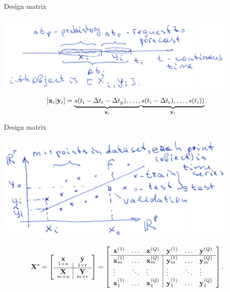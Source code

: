 \documentclass{beamer}
\begin{document}
\begin{frame}{Design matrix}

\includegraphics[width=0.9\textwidth]{draw_object.png} \\

\[
[{\mathbf{x}}_i | {\mathbf{y}}_i] = \underbrace{s(t_i-\Delta t_\text{r}-\Delta t_\text{p}),\dots,}_{{\mathbf{x}}_i} \underbrace{s(t_i-\Delta t_\text{r}),\dots,s(t_i))}_{{\mathbf{y}}_i}. \]

\end{frame}
\begin{frame}{Design matrix}


\includegraphics[width=0.9\textwidth]{forecasting_model.png}

\[
{\mathbf{X}}^*= \left[
\begin{array}{c|c}
\underset{1{\times}n}{{\mathbf{x}}} & \underset{1{\times}r}{{{\mathbf{y}}}}  \\
\hline
 \underset{m{\times}n}{{\mathbf{X}}} & \underset{m{\times}r}{\mathbf{Y}}  \\
 \end{array}
\right] =  \left[
\begin{array}{lll|lll}
{\mathbf{x}}^{(1)} & \dots & {\mathbf{x}}^{(Q)} & {\mathbf{y}}^{(1)} &  \dots & {{\mathbf{y}}}^{(Q)}   \\
\hline
{\mathbf{x}}_m^{(1)}  & \dots & {\mathbf{x}}_m^{(Q)} & {\mathbf{y}}_m^{(1)} &  \dots & {\mathbf{y}}_m^{(Q)}   \\
\vdots & \ddots & \vdots & \vdots & \ddots & \vdots  \\
{\mathbf{x}}_1^{(1)} & \dots & {\mathbf{x}}_1^{(Q)} & {\mathbf{y}}_1^{(1)}  & \dots & {\mathbf{y}}_1^{(Q)}   \\


\end{array}
\right]. \]


\end{frame}
\end{document}
